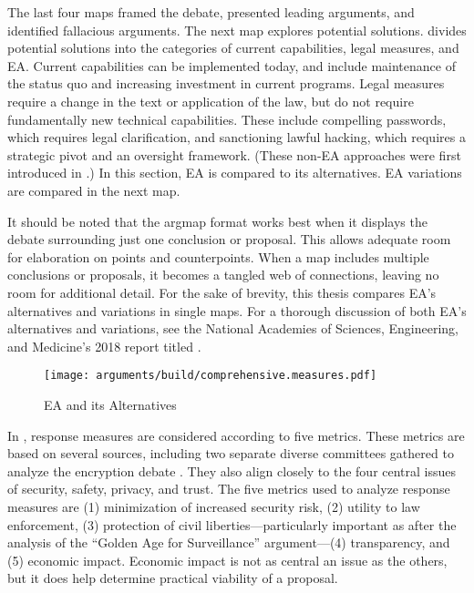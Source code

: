 The last four maps framed the debate, presented leading arguments, and identified fallacious arguments. The next map
explores potential solutions.  divides potential solutions into the categories of current
capabilities, legal measures, and \ac{EA}. Current capabilities can be implemented today, and include maintenance of the
status quo and increasing investment in current programs. Legal measures require a change in the text or application of
the law, but do not require fundamentally new technical capabilities. These include compelling passwords, which requires
legal clarification, and sanctioning lawful hacking, which requires a strategic pivot and an oversight framework. (These
non-\ac{EA} approaches were first introduced in .) In this section, \ac{EA} is compared to its
alternatives. \ac{EA} variations are compared in the next map.

It should be noted that the \ac{argmap} format works best when it displays the debate surrounding just one conclusion or
proposal. This allows adequate room for elaboration on points and counterpoints. When a map includes multiple
conclusions or proposals, it becomes a tangled web of connections, leaving no room for additional detail. For the sake
of brevity, this thesis compares \ac{EA}'s alternatives and variations in single maps. For a thorough discussion of both
\ac{EA}'s alternatives and variations, see the National Academies of Sciences, Engineering, and Medicine's 2018 report
titled  \cite{committee_decrypting_2018}.

\begin{sidewaysfigure}
  \centering\CaptionFontSize
  \texttt{[image: arguments/build/comprehensive.measures.pdf]}
  \caption{EA and its Alternatives}
  \label{fig-arg-measures}
\end{sidewaysfigure}

In , response measures are considered according to five metrics. These metrics are based on
several sources, including two separate diverse committees gathered to analyze the encryption debate
\cite{committee_decrypting_2018} \cite{group_2019} \cite{varia_2018}. They also align closely to the four central issues
of security, safety, privacy, and trust. The five metrics used to analyze response measures are (1) minimization of
increased security risk, (2) utility to law enforcement, (3) protection of civil liberties---particularly important as
after the analysis of the ``Golden Age for Surveillance'' argument---(4) transparency, and (5) economic impact. Economic
impact is not as central an issue as the others, but it does help determine practical viability of a proposal.

